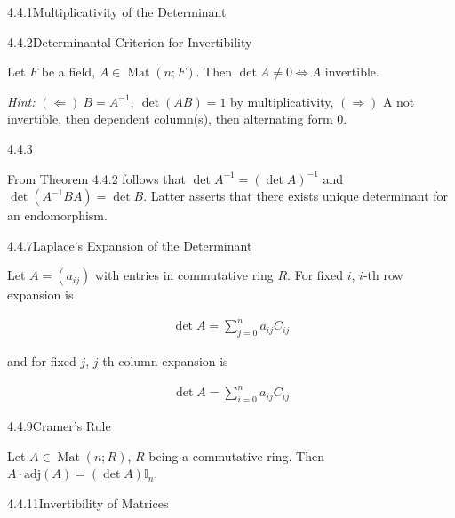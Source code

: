 \documentclass[10pt]{article} %
\DeclareMathOperator{\Mat}{Mat}
\newcommand{\Hint}{\vspace{0.2em}\textit{Hint: }}
\begin{document}
\begin{multicols}{3}
\begin{theorem}{4.4.1}{Multiplicativity of the Determinant}

\end{theorem}

\begin{theorem}{4.4.2}{Determinantal Criterion for Invertibility}

    Let $F$ be a field, $A \in \Mat(n;F)$. Then $\det{A} \neq 0 \Leftrightarrow A$ invertible.

    \Hint $(\Leftarrow)\ B = A^{-1},\ \det{(AB)} = 1$ by multiplicativity, $(\Rightarrow)$ A not invertible, then dependent column(s), then alternating form $0$.

\end{theorem}

\begin{remark}{4.4.3}{}

    From Theorem 4.4.2 follows that $\det{A^{-1}} = (\det{A})^{-1}$ and $\det{(A^{-1}BA)} = \det{B}$. Latter asserts that there exists unique determinant for an endomorphism.

\end{remark}

\begin{theorem}{4.4.7}{Laplace's Expansion of the Determinant}

    Let $A = (a_{ij})$ with entries in commutative ring $R$. For fixed $i$, $i$-th row expansion is

        \begin{align*}
            \det{A} = \sum_{j=0}^n a_{ij} C_{ij}
        \end{align*}

    and for fixed $j$, $j$-th column expansion is

        \begin{align*}
            \det{A} = \sum_{i=0}^n a_{ij} C_{ij}
        \end{align*}

\end{theorem}

\begin{theorem}{4.4.9}{Cramer's Rule}

    Let $A \in \Mat(n;R)$, $R$ being a commutative ring. Then $A \cdot \mathrm{adj}(A) = (\det{A}) \mathbb{I}_n$.

\end{theorem}

\begin{corollary}{4.4.11}{Invertibility of Matrices}


\end{corollary}
\end{multicols}
\end{document}

